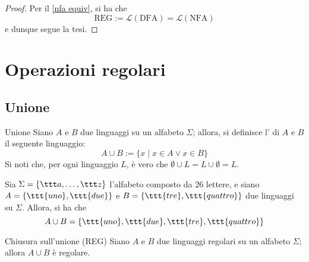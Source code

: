 \documentclass[a4paper, 12pt]{report}
\begin{document}
    \begin{proof}
        Per il \cref{nfa equiv}, si ha che $$\mathrm{REG} := \mathcal{L}(\mathrm{DFA}) = \mathcal{L}(\mathrm{NFA})$$ e dunque segue la tesi.
    \end{proof}

    \section{Operazioni regolari}

    \subsection{Unione}
    
    \begin{frameddefn}{Unione}
        Siano $A$ e $B$ due linguaggi su un alfabeto $\Sigma$; allora, si definisce l' di $A$ e $B$ il seguente linguaggio: $$A \cup B := \{x \mid x \in A \lor x \in B \}$$ Si noti che, per ogni linguaggio $L$, è vero che $\emptyset \cup L = L \cup \emptyset = L$.
    \end{frameddefn}

    \begin{example}[Unione]
        Sia $\Sigma = \{\ttt a , \ldots, \ttt z\}$ l'alfabeto composto da 26 lettere, e siano $A = \{\ttt{uno}, \ttt{due}\}$ e $B = \{\ttt{tre}, \ttt{quattro}\}$ due linguaggi su $\Sigma$. Allora, si ha che $$A \cup B = \{\ttt{uno}, \ttt{due}, \ttt{tre}, \ttt{quattro}\}$$
    \end{example}

    \begin{framedprop}[label={closure unione}]{Chiusura sull'unione (REG)}
        Siano $A$ e $B$ due linguaggi regolari su un alfabeto $\Sigma$; allora $A \cup B$ è regolare.
    \end{framedprop}
\end{document}
